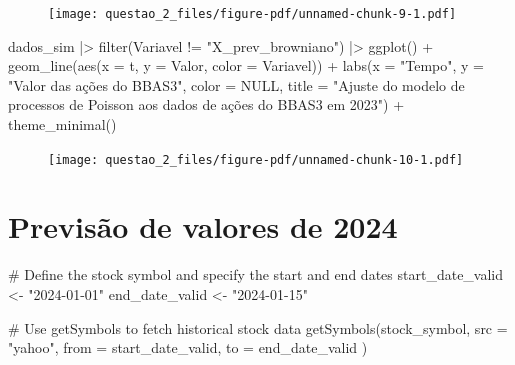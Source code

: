 \documentclass[
  letterpaper,
  DIV=11,
  numbers=noendperiod]{scrreprt}
\newenvironment{Shaded}{\begin{snugshade}}{\end{snugshade}}
\newcommand{\AttributeTok}[1]{\textcolor[rgb]{0.40,0.45,0.13}{#1}}
\newcommand{\CommentTok}[1]{\textcolor[rgb]{0.37,0.37,0.37}{#1}}
\newcommand{\ConstantTok}[1]{\textcolor[rgb]{0.56,0.35,0.01}{#1}}
\newcommand{\FunctionTok}[1]{\textcolor[rgb]{0.28,0.35,0.67}{#1}}
\newcommand{\NormalTok}[1]{\textcolor[rgb]{0.00,0.23,0.31}{#1}}
\newcommand{\OtherTok}[1]{\textcolor[rgb]{0.00,0.23,0.31}{#1}}
\newcommand{\SpecialCharTok}[1]{\textcolor[rgb]{0.37,0.37,0.37}{#1}}
\newcommand{\StringTok}[1]{\textcolor[rgb]{0.13,0.47,0.30}{#1}}
\begin{document}
\begin{figure}[H]

{\centering \texttt{[image: questao\_2\_files/figure-pdf/unnamed-chunk-9-1.pdf]}

}

\end{figure}

\begin{Shaded}
\begin{Highlighting}[]
\NormalTok{dados\_sim }\SpecialCharTok{|\textgreater{}}
    \FunctionTok{filter}\NormalTok{(Variavel }\SpecialCharTok{!=} \StringTok{"X\_prev\_browniano"}\NormalTok{) }\SpecialCharTok{|\textgreater{}}
    \FunctionTok{ggplot}\NormalTok{() }\SpecialCharTok{+}
    \FunctionTok{geom\_line}\NormalTok{(}\FunctionTok{aes}\NormalTok{(}\AttributeTok{x =}\NormalTok{ t, }\AttributeTok{y =}\NormalTok{ Valor, }\AttributeTok{color =}\NormalTok{ Variavel)) }\SpecialCharTok{+}
    \FunctionTok{labs}\NormalTok{(}\AttributeTok{x =} \StringTok{"Tempo"}\NormalTok{,}
         \AttributeTok{y =} \StringTok{"Valor das ações do BBAS3"}\NormalTok{,}
         \AttributeTok{color =} \ConstantTok{NULL}\NormalTok{,}
         \AttributeTok{title =} \StringTok{"Ajuste do modelo de processos de Poisson}
\StringTok{          aos dados de ações do BBAS3 em 2023"}\NormalTok{) }\SpecialCharTok{+}
    \FunctionTok{theme\_minimal}\NormalTok{()}
\end{Highlighting}
\end{Shaded}

\begin{figure}[H]

{\centering \texttt{[image: questao\_2\_files/figure-pdf/unnamed-chunk-10-1.pdf]}

}

\end{figure}

\hypertarget{previsuxe3o-de-valores-de-2024}{%
\section*{Previsão de valores de
2024}\label{previsuxe3o-de-valores-de-2024}}


\begin{Shaded}
\begin{Highlighting}[]
\CommentTok{\# Define the stock symbol and specify the start and end dates}
\NormalTok{start\_date\_valid }\OtherTok{\textless{}{-}} \StringTok{"2024{-}01{-}01"}
\NormalTok{end\_date\_valid }\OtherTok{\textless{}{-}} \StringTok{"2024{-}01{-}15"}

\CommentTok{\# Use getSymbols to fetch historical stock data}
\FunctionTok{getSymbols}\NormalTok{(stock\_symbol,}
    \AttributeTok{src =} \StringTok{"yahoo"}\NormalTok{,}
    \AttributeTok{from =}\NormalTok{ start\_date\_valid,}
    \AttributeTok{to =}\NormalTok{ end\_date\_valid}
\NormalTok{)}
\end{Highlighting}
\end{Shaded}
\end{document}
